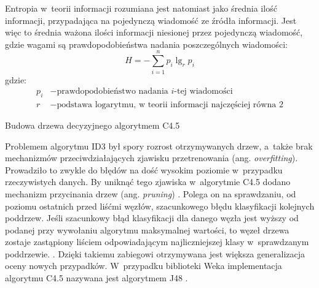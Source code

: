 \documentclass[a4paper,twoside,12pt]{book}
\newenvironment{algorytm}[1][]
  {\renewcommand{\algorithmcfname}{Algorytm}%
   \begin{algorithm}[#1]%
  }{\end{algorithm}}
\newcommand{\obcy}[1]{\emph{#1}}
\renewcommand{\ang}[1]{{\selectlanguage{british}\obcy{#1}}}
\renewcommand{\log}{\operatorname {lg}}
\begin{document}
Entropia w~teorii informacji rozumiana jest natomiast jako średnia ilość informacji, przypadająca na pojedynczą wiadomość ze źródła informacji. Jest więc to średnia ważona ilości informacji niesionej przez pojedynczą wiadomość, gdzie wagami są prawdopodobieństwa nadania poszczególnych wiadomości:
\begin{equation}
H = - \sum_{i=1}^{n} p_i \log_r{p_i}
\end{equation} 
gdzie:
\begin{align*}
	p_i &- \text{prawdopodobieństwo nadania $i$-tej wiadomości}\\
	r &- \text{podstawa logarytmu, w~teorii informacji najczęściej równa 2}
\end{align*}

\begin{algorytm}
\label{alg:c45}
\caption{Budowa drzewa decyzyjnego algorytmem C4.5}
\DontPrintSemicolon

\end{algorytm}

Problemem algorytmu ID3 był spory rozrost otrzymywanych drzew, a~także brak mechanizmów przeciwdziałających zjawisku przetrenowania (ang. \ang{overfitting}). Prowadziło to zwykle do błędów na dość wysokim poziomie w~przypadku rzeczywistych danych. By uniknąć tego zjawiska w~algorytmie C4.5 dodano mechanizm przycinania drzew (ang. \ang{pruning}) \cite{bib:pruning}. Polega on na sprawdzaniu, od poziomu ostatnich przed liśćmi węzłów, szacunkowego błędu klasyfikacji kolejnych poddrzew. Jeśli szacunkowy błąd klasyfikacji dla danego węzła jest wyższy od podanej przy wywołaniu algorytmu maksymalnej wartości, to węzeł drzewa zostaje zastąpiony liściem odpowiadającym najliczniejszej klasy w~sprawdzanym poddrzewie. \cite{bib:errorBasedPruning}.  Dzięki takiemu zabiegowi otrzymywana jest większa generalizacja oceny nowych przypadków. W~przypadku biblioteki Weka implementacja algorytmu C4.5 nazywana jest algorytmem J48 \cite{bib:wekaTree,bib:wekaTree2}.
\end{document}
